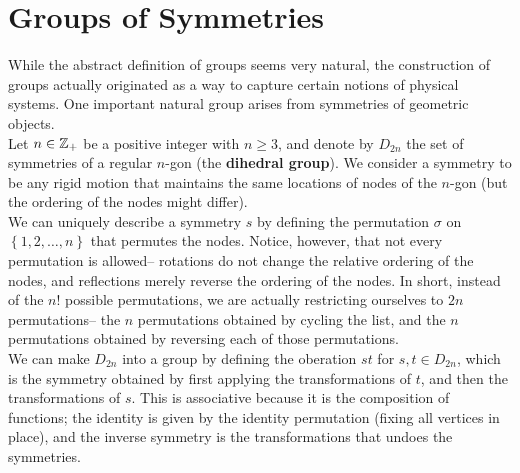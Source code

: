\documentclass{memoir}
\begin{document}
\section{Groups of Symmetries}
\label{sec:groups_of_symmetries}

While the abstract definition of groups seems very natural, the construction of groups actually originated as a way to capture certain notions of physical systems. One important natural group arises from symmetries of geometric objects.\\

Let \(n \in \mathbb{Z}_+\) be a positive integer with \(n\geq 3\), and denote by \(D_{2n}\) the set of symmetries of a regular \(n\)-gon (the \textbf{dihedral group}). We consider a symmetry to be any rigid motion that maintains the same locations of nodes of the \(n\)-gon (but the ordering of the nodes might differ).\\

We can uniquely describe a symmetry \(s\) by defining the permutation \(\sigma \) on \(\left\{ 1,2,\ldots,n \right\} \) that permutes the nodes. Notice, however, that not every permutation is allowed-- rotations do not change the relative ordering of the nodes, and reflections merely reverse the ordering of the nodes. In short, instead of the \(n!\) possible permutations, we are actually restricting ourselves to \(2n\) permutations-- the \(n\) permutations obtained by cycling the list, and the \(n\) permutations obtained by reversing each of those permutations.\\

We can make \(D_{2n}\) into a group by defining the oberation \(st\) for \(s,t \in D_{2n}\), which is the symmetry obtained by first applying the transformations of \(t\), and then the transformations of \(s\). This is associative because it is the composition of functions; the identity is given by the identity permutation (fixing all vertices in place), and the inverse symmetry is the transformations that undoes the symmetries.\\
\end{document}
